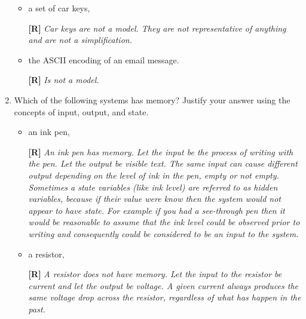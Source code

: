 \begin{enumerate}
\begin{itemize}
  \item a set of car keys,

    \begin{onlysolution}
      \textbf{[R]}
      \itshape
      Car keys are not a model. They are not representative of anything and are not a simplification.
    \end{onlysolution}

  \item the ASCII encoding of an email message.

    \begin{onlysolution}
      \textbf{[R]}
      \itshape
      Is not a model.
    \end{onlysolution}

\end{itemize}


\item
  Which of the following systems has memory? Justify your answer using
  the concepts of input, output, and state.
  \begin{itemize}
    \def\labelenumi{\alph{enumi})}
    \item  an ink pen,

      \begin{onlysolution}
        \textbf{[R]}
        \itshape
        An ink pen has memory. Let the input be the process of writing with the pen. 
        Let the output be visible text. The same input can cause different output 
        depending on the level of ink in the pen, empty or not empty. Sometimes a state 
        variables (like ink level) are referred to as hidden variables, because if their 
        value were know then the system would not appear to have state. For example if 
        you had a see-through pen then it would be reasonable to assume that the ink level 
        could be observed prior to writing and consequently could be considered to be an 
        input to the system.
      \end{onlysolution}

    \item a resistor,

      \begin{onlysolution}
        \textbf{[R]}
        \itshape
        A resistor does not have memory. Let the input to the resistor be current and let 
        the output be voltage. A given current always produces the same voltage drop across 
        the resistor, regardless of what has happen in the past.
      \end{onlysolution}
    

\end{itemize}
\end{enumerate}
